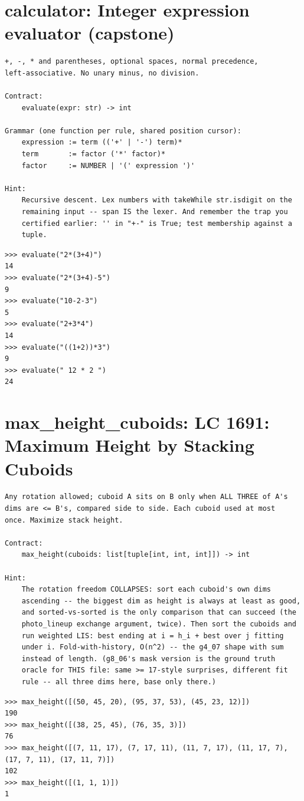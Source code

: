 \documentclass[10pt,letterpaper]{book}
\begin{document}
\section{calculator: Integer expression evaluator (capstone)}
\begin{lstlisting}[style=ex]
+, -, * and parentheses, optional spaces, normal precedence,
left-associative. No unary minus, no division.

Contract:
    evaluate(expr: str) -> int

Grammar (one function per rule, shared position cursor):
    expression := term (('+' | '-') term)*
    term       := factor ('*' factor)*
    factor     := NUMBER | '(' expression ')'

Hint:
    Recursive descent. Lex numbers with takeWhile str.isdigit on the
    remaining input -- span IS the lexer. And remember the trap you
    certified earlier: '' in "+-" is True; test membership against a
    tuple.
\end{lstlisting}
\begin{lstlisting}[style=ex]
>>> evaluate("2*(3+4)")
14
>>> evaluate("2*(3+4)-5")
9
>>> evaluate("10-2-3")
5
>>> evaluate("2+3*4")
14
>>> evaluate("((1+2))*3")
9
>>> evaluate(" 12 * 2 ")
24
\end{lstlisting}

\section{max\_height\_cuboids: LC 1691: Maximum Height by Stacking Cuboids}
\begin{lstlisting}[style=ex]
Any rotation allowed; cuboid A sits on B only when ALL THREE of A's
dims are <= B's, compared side to side. Each cuboid used at most
once. Maximize stack height.

Contract:
    max_height(cuboids: list[tuple[int, int, int]]) -> int

Hint:
    The rotation freedom COLLAPSES: sort each cuboid's own dims
    ascending -- the biggest dim as height is always at least as good,
    and sorted-vs-sorted is the only comparison that can succeed (the
    photo_lineup exchange argument, twice). Then sort the cuboids and
    run weighted LIS: best ending at i = h_i + best over j fitting
    under i. Fold-with-history, O(n^2) -- the g4_07 shape with sum
    instead of length. (g8_06's mask version is the ground truth
    oracle for THIS file: same >= 17-style surprises, different fit
    rule -- all three dims here, base only there.)
\end{lstlisting}
\begin{lstlisting}[style=ex]
>>> max_height([(50, 45, 20), (95, 37, 53), (45, 23, 12)])
190
>>> max_height([(38, 25, 45), (76, 35, 3)])
76
>>> max_height([(7, 11, 17), (7, 17, 11), (11, 7, 17), (11, 17, 7), (17, 7, 11), (17, 11, 7)])
102
>>> max_height([(1, 1, 1)])
1
\end{lstlisting}
\end{document}
